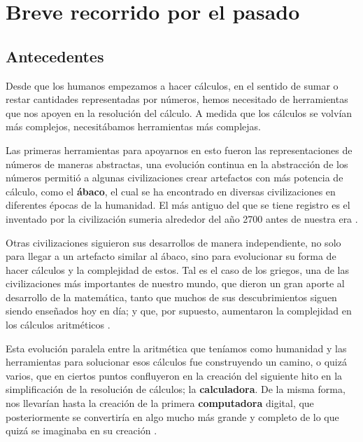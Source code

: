 \documentclass[letterpaper,12pt,oneside]{book}
\begin{document}
	\section{Breve recorrido por el pasado}
		\subsection{Antecedentes}
		
		Desde que los humanos empezamos a hacer cálculos, en el sentido de sumar o restar cantidades representadas por números, hemos necesitado de herramientas
		que nos apoyen en la resolución del cálculo. A medida que los cálculos se volvían más complejos, necesitábamos herramientas más complejas. 
		
		Las
		primeras herramientas para apoyarnos en esto fueron las representaciones de números de maneras abstractas, una evolución continua en la abstracción
		de los números permitió a algunas civilizaciones crear artefactos con más potencia de cálculo, como el \textbf{ábaco}, el cual se ha encontrado
		en diversas civilizaciones en diferentes épocas de la humanidad. El más antiguo del que se tiene registro es el inventado por la civilización
		sumeria alrededor del año 2700 antes de nuestra era \cite{ifrah_universal_2001}.
  
        Otras civilizaciones siguieron sus desarrollos de manera independiente, no solo para llegar a un artefacto
		similar al ábaco, sino para evolucionar su forma de hacer cálculos y la complejidad de estos. Tal es el caso de los griegos, una de las civilizaciones
		más importantes de nuestro mundo, que dieron un gran aporte al desarrollo de la matemática, tanto que muchos de sus descubrimientos siguen siendo
		enseñados hoy en día; y que, por supuesto, aumentaron la complejidad en los cálculos aritméticos \cite{ifrah_universal_2001}.
  
        Esta evolución paralela entre la aritmética que teníamos como humanidad 
		y las herramientas para solucionar esos cálculos
		fue construyendo un camino, o quizá varios, que en ciertos puntos confluyeron en la creación del siguiente hito en la simplificación de la resolución
		de cálculos; la \textbf{calculadora}. De la misma forma, nos llevarían hasta la creación de la primera \textbf{computadora} digital, que posteriormente se convertiría
		en algo mucho más grande y completo de lo que quizá se imaginaba en su creación \cite{ifrah_universal_2001}.
		
\end{document}

